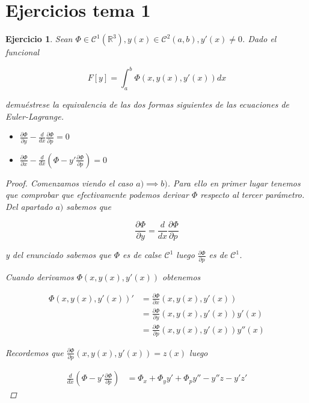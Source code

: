 \documentclass[12pt]{article}
\newtheorem{ejercicio}{Ejercicio}[section]
\theoremstyle{definition}
\theoremstyle{remark}
\newcommand{\xcero}{(a,b)}
\begin{document}
\section{Ejercicios tema 1}

\begin{ejercicio}
  Sean $\Phi\in \mathcal{C}^1(\mathbb{R}^3), y(x)\in \mathcal{C}^2\xcero, y'(x) \neq 0$. Dado el funcional

  \[
    F[y] = \int_{a}^{b}{\Phi(x,y(x),y'(x))dx}
  \]

  demuéstrese la equivalencia de las dos formas siguientes de las
  ecuaciones de Euler-Lagrange.

  \begin{itemize}
  \item $\frac{\partial\Phi}{\partial y}-\frac{d}{dx}\frac{\partial\Phi}{\partial p} = 0 $
  \item $\frac{\partial\Phi}{\partial x} - \frac{d}{dx}(\Phi-y'\frac{\partial\Phi}{\partial p}) = 0$
  \end{itemize}

  \begin{proof}
    Comenzamos viendo el caso $a) \implies b)$. Para ello en primer
    lugar tenemos que comprobar que efectivamente podemos derivar
    $\Phi$ respecto al tercer parámetro. Del apartado $a)$ sabemos que

    \[
      \frac{\partial\Phi}{\partial y} = \frac{d}{dx}\frac{\partial\Phi}{\partial p}
    \]
    
    y del enunciado sabemos que $\Phi$ es de calse $\mathcal{C}^1$
    luego $\frac{\partial\Phi}{\partial p}$ es de $\mathcal{C}^1$.

    Cuando derivamos $\Phi(x,y(x),y'(x))$ obtenemos

    \begin{align*}
      \Phi(x,y(x),y'(x))' & = \frac{\partial\Phi}{\partial x}(x, y(x), y'(x)) \\
                          & = \frac{\partial\Phi}{\partial y}(x, y(x), y'(x))y'(x) \\
                          & = \frac{\partial\Phi}{\partial p}(x, y(x), y'(x))y''(x)
    \end{align*}

    Recordemos que $\frac{\partial\Phi}{\partial p}(x, y(x), y'(x)) = z(x)$ luego

    \begin{align*}
      \frac{d}{dx}(\Phi-y'\frac{\partial\Phi}{\partial p}) & = \Phi_x + \Phi_yy' + \Phi_py'' - y''z -y'z'
    \end{align*}


\end{proof}
\end{ejercicio}
\end{document}
